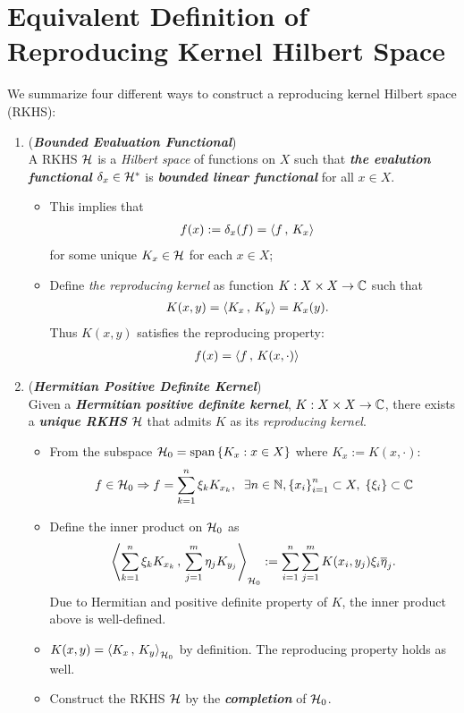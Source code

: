 \documentclass[11pt]{article}
\begin{document}
\newpage
\section{Equivalent Definition of Reproducing Kernel Hilbert Space}
We summarize four different ways to construct a reproducing kernel Hilbert space (RKHS):
\begin{enumerate}
\item (\emph{\textbf{Bounded Evaluation Functional}})\\ A RKHS ${\mathcal H}$ is a \emph{Hilbert space} of functions on $X$ such that \emph{\textbf{the evalution functional}} $\delta_x \in {\mathcal H}^{*}$ is \emph{\textbf{bounded linear functional}} for all $x \in X$. 
\begin{itemize}
\item This implies that
 \begin{align*}
f(x) := \delta_x(f)  &= \left\langle f\,,\, K_x \right\rangle
\end{align*} for some unique $K_x \in {\mathcal H}$ for each $x \in X$;
\item Define \emph{the reproducing kernel} as function $K: X \times X \rightarrow {\mathbb C}$ such that
\begin{align*}
K(x, y) &= \left\langle K_x\,,\, K_y \right\rangle = K_x(y).
\end{align*} Thus $K(x, y)$ satisfies the reproducing property:
\begin{align*}
f(x) &= \left\langle f\,,\, K(x, \cdot) \right\rangle
\end{align*}
\end{itemize}

\item  (\emph{\textbf{Hermitian Positive Definite Kernel}})\\ 
Given a \emph{\textbf{Hermitian positive definite kernel}}, $K: X \times X \rightarrow {\mathbb C}$, there exists a \emph{\textbf{unique RKHS}} ${\mathcal H}$ that admits $K$ as its \emph{reproducing kernel}.
\begin{itemize}
\item From the subspace ${\mathcal H}_0 = \text{span}\left\{K_x: x\in X\right\}$ where $K_x:= K(x, \cdot)$:
\begin{align*}
f \in {\mathcal H}_0 \Rightarrow f = \sum_{k=1}^{n}\xi_{k}K_{x_{k}}, \;\; \exists n\in {\mathbb N}, \left\{x_i\right\}_{i=1}^{n} \subset X, \; \left\{\xi_i\right\} \subset {\mathbb C}
\end{align*}
\item Define the inner product on ${\mathcal H}_0$ as 
\begin{align*}
\left\langle \sum_{k=1}^{n}\xi_{k}K_{x_{k}}\,,\, \sum_{j=1}^{m}\eta_{j}K_{y_{j}} \right\rangle_{{\mathcal H}_0} := \sum_{i=1}^{n}\sum_{j=1}^{m}K(x_{i}, y_{j})\xi_{i}\overline{\eta}_{j}.
\end{align*} Due to Hermitian and positive definite property of $K$, the inner product above is well-defined.
\item $K(x, y) = \left\langle K_x\,,\, K_y \right\rangle_{{\mathcal H}_0}$ by definition. The reproducing property holds as well.
\item Construct the RKHS ${\mathcal H}$ by the \emph{\textbf{completion}} of ${\mathcal H}_0$.
\end{itemize}



\end{enumerate}
\end{document}
